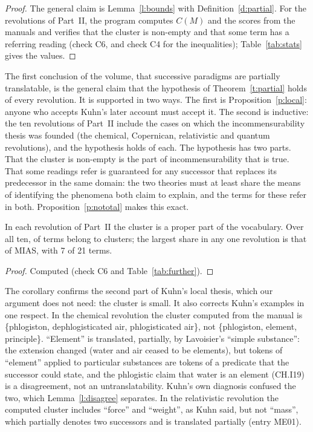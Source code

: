 \documentclass{situationist-preprint}
\begin{document}
\begin{proof}
The general claim is Lemma~\ref{l:bounds} with Definition~\ref{d:partial}. For the revolutions of Part~II, the program computes $C(M)$ and the scores from the manuals and verifies that the cluster is non-empty and that some term has a referring reading (check C6, and check C4 for the inequalities); Table~\ref{tab:stats} gives the values.
\end{proof}

The first conclusion of the volume, that successive paradigms are partially translatable, is the general claim that the hypothesis of Theorem~\ref{t:partial} holds of every revolution. It is supported in two ways. The first is Proposition~\ref{p:local}: anyone who accepts Kuhn's later account must accept it. The second is inductive: the ten revolutions of Part~II include the cases on which the incommensurability thesis was founded (the chemical, Copernican, relativistic and quantum revolutions), and the hypothesis holds of each. The hypothesis has two parts. That the cluster is non-empty is the part of incommensurability that is true. That some readings refer is guaranteed for any successor that replaces its predecessor in the same domain: the two theories must at least share the means of identifying the phenomena both claim to explain, and the terms for these refer in both. Proposition~\ref{p:nototal} makes this exact.

\begin{corollary}[Locality]\label{c:local}
In each revolution of Part~II the cluster is a proper part of the vocabulary. Over all ten, \nclusterall{} of \ntermsall{} terms belong to clusters; the largest share in any one revolution is that of MIAS, with 7 of 21 terms.
\end{corollary}

\begin{proof}
Computed (check C6 and Table~\ref{tab:further}).
\end{proof}

The corollary confirms the second part of Kuhn's local thesis, which our argument does not need: the cluster is small. It also corrects Kuhn's examples in one respect. In the chemical revolution the cluster computed from the manual is \{phlogiston, dephlogisticated air, phlogisticated air\}, not \{phlogiston, element, principle\}. \enquote{Element} is translated, partially, by Lavoisier's \enquote{simple substance}: the extension changed (water and air ceased to be elements), but tokens of \enquote{element} applied to particular substances are tokens of a predicate that the successor could state, and the phlogistic claim that water is an element (CH.I19) is a disagreement, not an untranslatability. Kuhn's own diagnosis confused the two, which Lemma~\ref{l:disagree} separates. In the relativistic revolution the computed cluster includes \enquote{force} and \enquote{weight}, as Kuhn said, but not \enquote{mass}, which partially denotes two successors and is translated partially (entry ME01).
\end{document}
